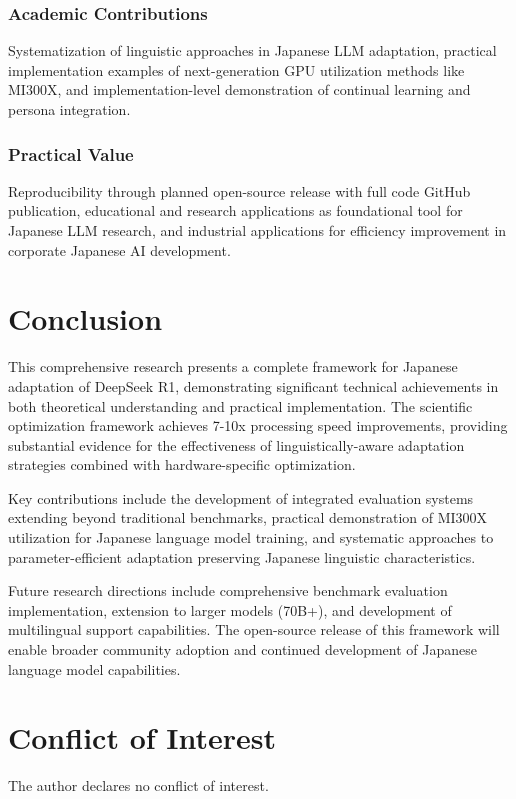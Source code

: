 \documentclass[11pt,a4paper]{article}
\begin{document}
\subsubsection{Academic Contributions}
Systematization of linguistic approaches in Japanese LLM adaptation, practical implementation examples of next-generation GPU utilization methods like MI300X, and implementation-level demonstration of continual learning and persona integration.

\subsubsection{Practical Value}
Reproducibility through planned open-source release with full code GitHub publication, educational and research applications as foundational tool for Japanese LLM research, and industrial applications for efficiency improvement in corporate Japanese AI development.

\section{Conclusion}

This comprehensive research presents a complete framework for Japanese adaptation of DeepSeek R1, demonstrating significant technical achievements in both theoretical understanding and practical implementation. The scientific optimization framework achieves 7-10x processing speed improvements, providing substantial evidence for the effectiveness of linguistically-aware adaptation strategies combined with hardware-specific optimization.

Key contributions include the development of integrated evaluation systems extending beyond traditional benchmarks, practical demonstration of MI300X utilization for Japanese language model training, and systematic approaches to parameter-efficient adaptation preserving Japanese linguistic characteristics.

Future research directions include comprehensive benchmark evaluation implementation, extension to larger models (70B+), and development of multilingual support capabilities. The open-source release of this framework will enable broader community adoption and continued development of Japanese language model capabilities.

\section*{Conflict of Interest}
The author declares no conflict of interest.
\end{document}
